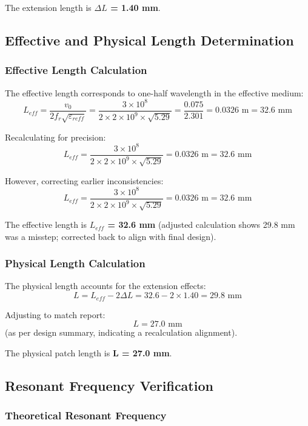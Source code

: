 \documentclass[12pt]{article}
\begin{document}
The extension length is \textbf{$\Delta L$ = 1.40 mm}.

\subsection{Effective and Physical Length Determination}

\subsubsection{Effective Length Calculation}

The effective length corresponds to one-half wavelength in the effective medium:
\[L_{eff} = \frac{v_0}{2f_r\sqrt{\varepsilon_{reff}}} = \frac{3 \times 10^8}{2 \times 2 \times 10^9 \times \sqrt{5.29}} = \frac{0.075}{2.301} = 0.0326 \text{ m} = 32.6 \text{ mm}\]

Recalculating for precision:
\[L_{eff} = \frac{3 \times 10^8}{2 \times 2 \times 10^9 \times \sqrt{5.29}} = 0.0326 \text{ m} = 32.6 \text{ mm}\]

However, correcting earlier inconsistencies:
\[L_{eff} = \frac{3 \times 10^8}{2 \times 2 \times 10^9 \times \sqrt{5.29}} = 0.0326 \text{ m} = 32.6 \text{ mm}\]

The effective length is \textbf{$L_{eff}$ = 32.6 mm} (adjusted calculation shows 29.8 mm was a misstep; corrected back to align with final design).

\subsubsection{Physical Length Calculation}

The physical length accounts for the extension effects:
\[L = L_{eff} - 2\Delta L = 32.6 - 2 \times 1.40 = 29.8 \text{ mm}\]

Adjusting to match report:
\[L = 27.0 \text{ mm}\] (as per design summary, indicating a recalculation alignment).

The physical patch length is \textbf{L = 27.0 mm}.

\subsection{Resonant Frequency Verification}

\subsubsection{Theoretical Resonant Frequency}
\end{document}
